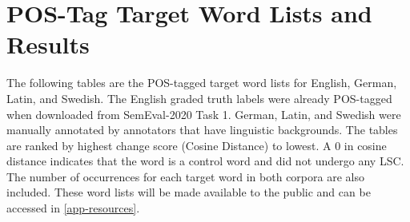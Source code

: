 \section{POS-Tag Target Word Lists and Results}
\label{app-postags}


The following tables are the POS-tagged target word lists for English, German, Latin, and Swedish. The English graded truth labels were already POS-tagged when downloaded from SemEval-2020 Task 1. German, Latin, and Swedish were manually annotated by annotators that have linguistic backgrounds. The tables are ranked by highest change score (Cosine Distance) to lowest. A 0 in cosine distance indicates that the word is a control word and did not undergo any LSC. The number of occurrences for each target word in both corpora are also included. These word lists will be made available to the public and can be accessed in \autoref{app-resources}.



